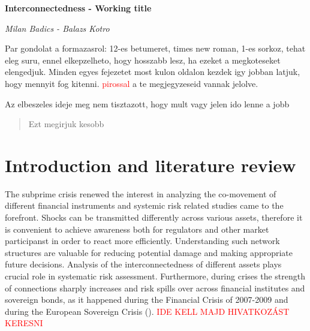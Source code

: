 \documentclass[12pt,bibliography=totoc]{article}
\begin{document}
\begin{titlepage}




 \begin{center}
\Huge\textbf{Interconnectedness - Working title}\\
 
\vspace{3cm}


 \Large\textit{Milan Badics - Balazs Kotro}
 
 \vspace{4cm}
Par gondolat a formazasrol: 12-es betumeret, times new roman, 1-es sorkoz, tehat eleg suru, ennel elkepzelheto, hogy hosszabb lesz, ha ezeket a megkoteseket elengedjuk. Minden egyes fejezetet most kulon oldalon kezdek igy jobban latjuk, hogy mennyit fog kitenni.  \textcolor{red}{pirossal} a te megjegyzeseid vannak jelolve.

Az elbeszeles ideje meg nem tisztazott, hogy mult vagy jelen ido lenne a jobb
\vspace{4cm}
\end{center}

\begin{abstract}
Ezt megirjuk kesobb
\end{abstract}


\end{titlepage}

\newpage

\section{Introduction and literature review}


The subprime crisis renewed the interest in analyzing the co-movement of different financial instruments and systemic risk related studies came to the forefront. Shocks can be transmitted differently across various assets, therefore it is convenient to achieve awareness both for regulators and other market participanst in order to react more efficiently. Understanding such network structures are valuable for reducing potential damage and making appropriate future decisions. Analysis of the interconnectedness of different assets plays crucial role in systematic risk assessment. Furthermore, during crises the strength of connections sharply increases and risk spills over across financial institutes and sovereign bonds, as it happened during the Financial Crisis of 2007-2009 and during the European Sovereign Crisis (\cite{diebold2012better}). \textcolor{red}{IDE KELL MAJD HIVATKOZÁST KERESNI}
\end{document}
